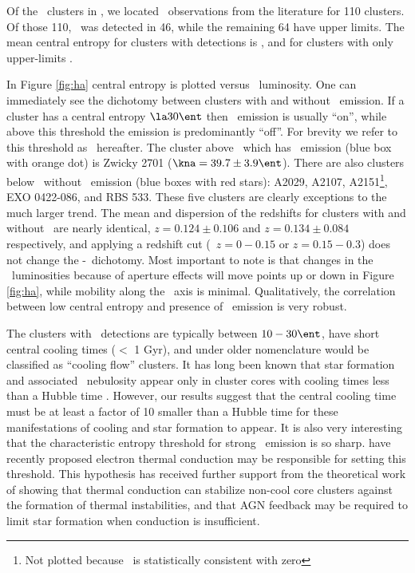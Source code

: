 \documentclass{emulateapj}
\begin{document}
Of the \clnum\ clusters in \accept, we located \halpha\ observations
from the literature for 110 clusters. Of those 110, \halpha\ was
detected in 46, while the remaining 64 have upper limits. The mean
central entropy for clusters with detections is \fha, and for clusters
with only upper-limits \nfha.

In Figure \ref{fig:ha} central entropy is plotted versus
\halpha\ luminosity. One can immediately see the dichotomy between
clusters with and without \halpha\ emission. If a cluster has a
central entropy $\la 30 \ent$ then \halpha\ emission is usually
``on'', while above this threshold the emission is predominantly
``off''. For brevity we refer to this threshold as
\kthr\ hereafter. The cluster above \kthr\ which has \halpha\ emission
(blue box with orange dot) is Zwicky 2701 ($\kna = 39.7 \pm 3.9
\ent$). There are also clusters below \kthr\ without \halpha\ emission
(blue boxes with red stars): A2029, A2107, A2151\footnote{Not plotted
  because \kna\ is statistically consistent with zero}, EXO 0422-086,
and RBS 533. These five clusters are clearly exceptions to the much
larger trend. The mean and dispersion of the redshifts for clusters
with and without \halpha\ are nearly identical, $z = 0.124 \pm 0.106$
and $z = 0.134 \pm 0.084$ respectively, and applying a redshift cut
(\ie\ $z = 0-0.15$ or $z = 0.15-0.3$) does not change the
\kna-\halpha\ dichotomy. Most important to note is that changes in the
\halpha\ luminosities because of aperture effects will move points up
or down in Figure \ref{fig:ha}, while mobility along the \kna\ axis is
minimal. Qualitatively, the correlation between low central entropy
and presence of \halpha\ emission is very robust.

The clusters with \halpha\ detections are typically between $10-30
\ent$, have short central cooling times ($<$ 1 Gyr), and under older
nomenclature would be classified as ``cooling flow'' clusters.  It has
long been known that star formation and associated \halpha\ nebulosity
appear only in cluster cores with cooling times less than a Hubble
time \citep{hu85, johnstone87, mcnamara89, voit97,cardiel98}. However,
our results suggest that the central cooling time must be at least a
factor of 10 smaller than a Hubble time for these manifestations of
cooling and star formation to appear.  It is also very interesting
that the characteristic entropy threshold for strong \halpha\ emission
is so sharp. \cite{conduction} have recently proposed electron thermal
conduction may be responsible for setting this threshold. This
hypothesis has received further support from the theoretical work of
\cite{2008arXiv0804.3823G} showing that thermal conduction can
stabilize non-cool core clusters against the formation of thermal
instabilities, and that AGN feedback may be required to limit star
formation when conduction is insufficient.
\end{document}
